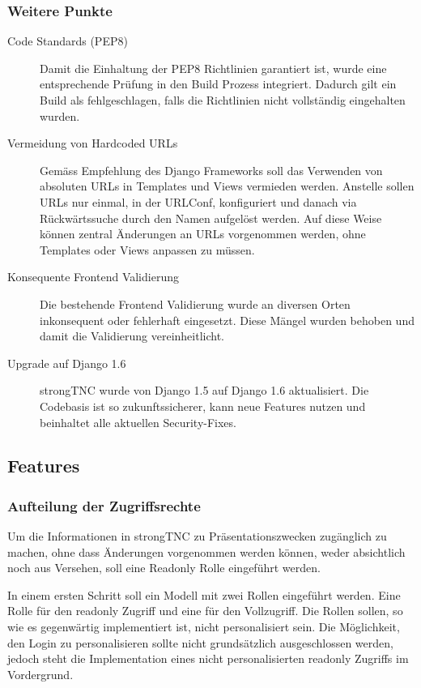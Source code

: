 \subsubsection{Weitere Punkte}
\begin{description}

\item[Code Standards (PEP8)] Damit die Einhaltung der PEP8 Richtlinien
	garantiert ist, wurde eine entsprechende Prüfung in den Build Prozess
	integriert. Dadurch gilt ein Build als fehlgeschlagen, falls die Richtlinien
	nicht vollständig eingehalten wurden.

\item[Vermeidung von Hardcoded URLs] Gemäss Empfehlung des Django Frameworks
	soll das Verwenden von absoluten URLs in Templates und Views vermieden werden.
	Anstelle sollen URLs nur einmal, in der URLConf, konfiguriert und danach via
	Rückwärtssuche durch den Namen aufgelöst werden. Auf diese Weise können
	zentral Änderungen an URLs vorgenommen werden, ohne Templates oder Views
	anpassen zu müssen.

\item[Konsequente Frontend Validierung] Die bestehende Frontend Validierung
	wurde an diversen Orten inkonsequent oder fehlerhaft eingesetzt. Diese Mängel
	wurden behoben und damit die Validierung vereinheitlicht.

\item[Upgrade auf Django 1.6] strongTNC wurde von Django 1.5 auf Django 1.6
	aktualisiert. Die Codebasis ist so zukunftssicherer, kann neue Features nutzen
	und beinhaltet alle aktuellen Security-Fixes.

\end{description}

\subsection{Features}

\subsubsection{Aufteilung der Zugriffsrechte}
Um die Informationen in strongTNC zu Präsentationszwecken zugänglich zu machen,
ohne dass Änderungen vorgenommen werden können, weder absichtlich noch aus
Versehen, soll eine Readonly Rolle eingeführt werden.

In einem ersten Schritt soll ein Modell mit zwei Rollen eingeführt werden. Eine
Rolle für den readonly Zugriff und eine für den Vollzugriff. Die Rollen sollen,
so wie es gegenwärtig implementiert ist, nicht personalisiert sein. Die
Möglichkeit, den Login zu personalisieren sollte nicht grundsätzlich
ausgeschlossen werden, jedoch steht die Implementation eines nicht
personalisierten readonly Zugriffs im Vordergrund.

